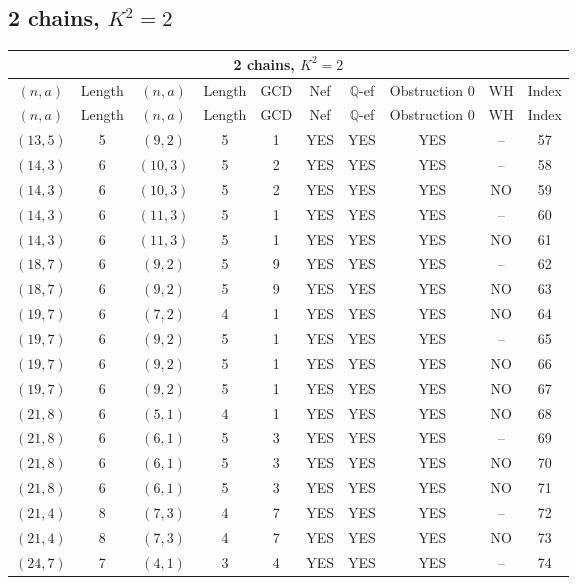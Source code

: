 \subsection{2 chains, $K^2 = 2$}
\begin{longtable}{|c|c|c|c|c|c|c|c|c|c|}
\hline
\multicolumn{10}{|c|}{2 chains, $K^2 = 2$}\\
\hline
$(n,a)$ & Length & $(n,a)$ & Length & GCD & Nef & $\mathbb Q$-ef & Obstruction 0 & WH & Index\\
\hline
\endfirsthead

\hline
$(n,a)$ & Length & $(n,a)$ & Length & GCD & Nef & $\mathbb Q$-ef & Obstruction 0 & WH & Index\\
\hline
\endhead
\hline
\endfoot

$(13, 5)$ & 5 & $(9, 2)$ & 5 & 1 & YES & YES & YES & -- & 57\\
$(14, 3)$ & 6 & $(10, 3)$ & 5 & 2 & YES & YES & YES & -- & 58\\
$(14, 3)$ & 6 & $(10, 3)$ & 5 & 2 & YES & YES & YES & NO & 59\\
$(14, 3)$ & 6 & $(11, 3)$ & 5 & 1 & YES & YES & YES & -- & 60\\
$(14, 3)$ & 6 & $(11, 3)$ & 5 & 1 & YES & YES & YES & NO & 61\\
$(18, 7)$ & 6 & $(9, 2)$ & 5 & 9 & YES & YES & YES & -- & 62\\
$(18, 7)$ & 6 & $(9, 2)$ & 5 & 9 & YES & YES & YES & NO & 63\\
$(19, 7)$ & 6 & $(7, 2)$ & 4 & 1 & YES & YES & YES & NO & 64\\
$(19, 7)$ & 6 & $(9, 2)$ & 5 & 1 & YES & YES & YES & -- & 65\\
$(19, 7)$ & 6 & $(9, 2)$ & 5 & 1 & YES & YES & YES & NO & 66\\
$(19, 7)$ & 6 & $(9, 2)$ & 5 & 1 & YES & YES & YES & NO & 67\\
$(21, 8)$ & 6 & $(5, 1)$ & 4 & 1 & YES & YES & YES & NO & 68\\
$(21, 8)$ & 6 & $(6, 1)$ & 5 & 3 & YES & YES & YES & -- & 69\\
$(21, 8)$ & 6 & $(6, 1)$ & 5 & 3 & YES & YES & YES & NO & 70\\
$(21, 8)$ & 6 & $(6, 1)$ & 5 & 3 & YES & YES & YES & NO & 71\\
$(21, 4)$ & 8 & $(7, 3)$ & 4 & 7 & YES & YES & YES & -- & 72\\
$(21, 4)$ & 8 & $(7, 3)$ & 4 & 7 & YES & YES & YES & NO & 73\\
$(24, 7)$ & 7 & $(4, 1)$ & 3 & 4 & YES & YES & YES & -- & 74\\

\end{longtable}

